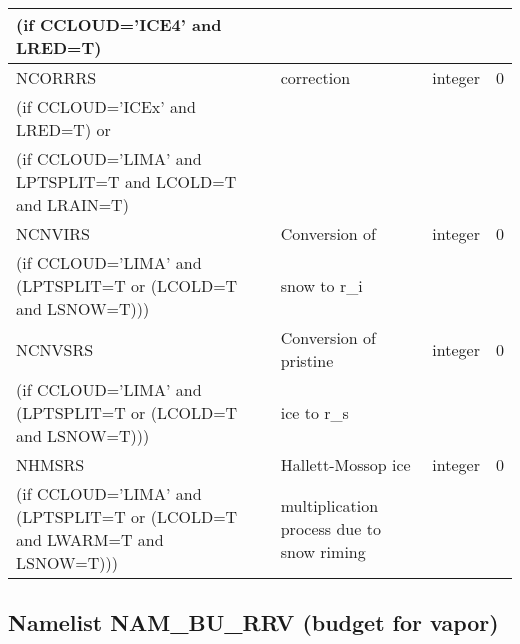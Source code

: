 \begin{longtable} {|p{}|p{}|>{\centering}p{}|p{}<{\centering}|}
(if CCLOUD='ICE4' and LRED=T) & &   &  \\\hline
NCORRRS&   correction & integer  &  0 \index{NCORRRS!\innam{NAM\_BU\_RRS}}\\ \nopagebreak
(if CCLOUD='ICEx' and LRED=T) or & &   &  \\ \nopagebreak
(if CCLOUD='LIMA' and LPTSPLIT=T and LCOLD=T and LRAIN=T) & &   &  \\\hline
NCNVIRS  &Conversion of    & integer  &  0 \index{NCNVIRS!\innam{NAM\_BU\_RRS}}\\ \nopagebreak
(if CCLOUD='LIMA' and (LPTSPLIT=T or (LCOLD=T and LSNOW=T))) & snow to r\_i&   &  \\\hline
NCNVSRS  & Conversion of pristine  & integer  &  0 \index{NCNVSRS!\innam{NAM\_BU\_RRS}}\\ \nopagebreak
(if CCLOUD='LIMA' and (LPTSPLIT=T or (LCOLD=T and LSNOW=T))) & ice to r\_s &   &  \\\hline
NHMSRS  &Hallett-Mossop ice  & integer  &  0 \index{NHMSRS!\innam{NAM\_BU\_RRS}}\\ \nopagebreak
(if CCLOUD='LIMA' and (LPTSPLIT=T or (LCOLD=T and LWARM=T and LSNOW=T))) & multiplication process due to snow riming &   &  \\\hline
\end{longtable}

\subsection{Namelist NAM\_BU\_RRV (budget for  vapor)}

